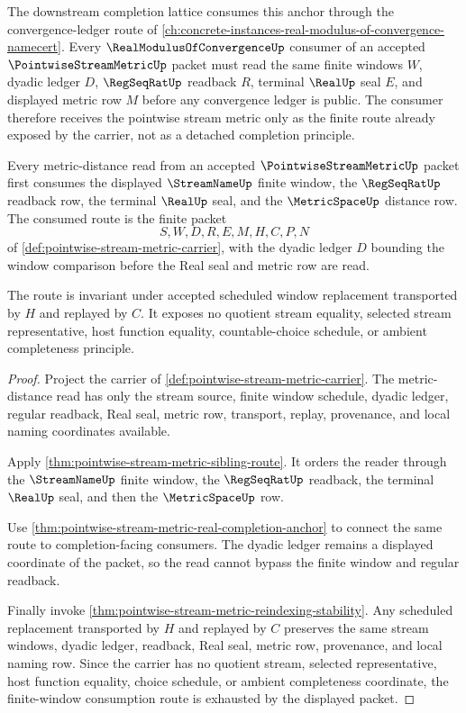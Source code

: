 The downstream completion lattice consumes this anchor through the convergence-ledger route of \autoref{ch:concrete-instances-real-modulus-of-convergence-namecert}. Every $\RealModulusOfConvergenceUp$ consumer of an accepted $\PointwiseStreamMetricUp$ packet must read the same finite windows $W$, dyadic ledger $D$, $\RegSeqRatUp$ readback $R$, terminal $\RealUp$ seal $E$, and displayed metric row $M$ before any convergence ledger is public. The consumer therefore receives the pointwise stream metric only as the finite route already exposed by the carrier, not as a detached completion principle.

\begin{theorem}
\label{thm:pointwise-stream-metric-finite-window-consumption}
Every metric-distance read from an accepted $\PointwiseStreamMetricUp$ packet
first consumes the displayed $\StreamNameUp$ finite window, the $\RegSeqRatUp$
readback row, the terminal $\RealUp$ seal, and the $\MetricSpaceUp$ distance
row. The consumed route is the finite packet
$$
S,W,D,R,E,M,H,C,P,N
$$
of \autoref{def:pointwise-stream-metric-carrier}, with the dyadic ledger $D$
bounding the window comparison before the Real seal and metric row are read.

The route is invariant under accepted scheduled window replacement transported
by $H$ and replayed by $C$. It exposes no quotient stream equality, selected
stream representative, host function equality, countable-choice schedule, or
ambient completeness principle.
\end{theorem}
\begin{proof}
Project the carrier of \autoref{def:pointwise-stream-metric-carrier}. The
metric-distance read has only the stream source, finite window schedule,
dyadic ledger, regular readback, Real seal, metric row, transport, replay,
provenance, and local naming coordinates available.

Apply \autoref{thm:pointwise-stream-metric-sibling-route}. It orders the
reader through the $\StreamNameUp$ finite window, the $\RegSeqRatUp$ readback,
the terminal $\RealUp$ seal, and then the $\MetricSpaceUp$ row.

Use \autoref{thm:pointwise-stream-metric-real-completion-anchor} to connect
the same route to completion-facing consumers. The dyadic ledger remains a
displayed coordinate of the packet, so the read cannot bypass the finite
window and regular readback.

Finally invoke \autoref{thm:pointwise-stream-metric-reindexing-stability}. Any
scheduled replacement transported by $H$ and replayed by $C$ preserves the
same stream windows, dyadic ledger, readback, Real seal, metric row,
provenance, and local naming row. Since the carrier has no quotient stream,
selected representative, host function equality, choice schedule, or ambient
completeness coordinate, the finite-window consumption route is exhausted by
the displayed packet.
\end{proof}

